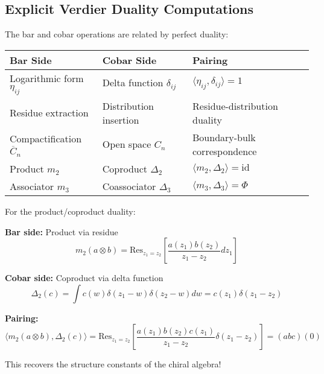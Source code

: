 \subsection{Explicit Verdier Duality Computations}

\begin{theorem}
The bar and cobar operations are related by perfect duality:

\begin{center}
\begin{tabular}{|l|l|l|}
\hline
\textbf{Bar Side} & \textbf{Cobar Side} & \textbf{Pairing} \\
\hline
Logarithmic form $\eta_{ij}$ & Delta function $\delta_{ij}$ & $\langle \eta_{ij}, \delta_{ij} \rangle = 1$ \\
Residue extraction & Distribution insertion & Residue-distribution duality \\
Compactification $\overline{C}_n$ & Open space $C_n$ & Boundary-bulk correspondence \\
Product $m_2$ & Coproduct $\Delta_2$ & $\langle m_2, \Delta_2 \rangle = \text{id}$ \\
Associator $m_3$ & Coassociator $\Delta_3$ & $\langle m_3, \Delta_3 \rangle = \Phi$ \\
\hline
\end{tabular}
\end{center}
\end{theorem}

\begin{example}
For the product/coproduct duality:

\textbf{Bar side:} Product via residue
$$m_2(a \otimes b) = \text{Res}_{z_1=z_2}\left[\frac{a(z_1)b(z_2)}{z_1-z_2}dz_1\right]$$

\textbf{Cobar side:} Coproduct via delta function
$$\Delta_2(c) = \int c(w) \delta(z_1-w)\delta(z_2-w) dw = c(z_1)\delta(z_1-z_2)$$

\textbf{Pairing:}
$$\langle m_2(a \otimes b), \Delta_2(c) \rangle = \text{Res}_{z_1=z_2}\left[\frac{a(z_1)b(z_2)c(z_1)}{z_1-z_2}\delta(z_1-z_2)\right] = (abc)(0)$$

This recovers the structure constants of the chiral algebra!
\end{example}


